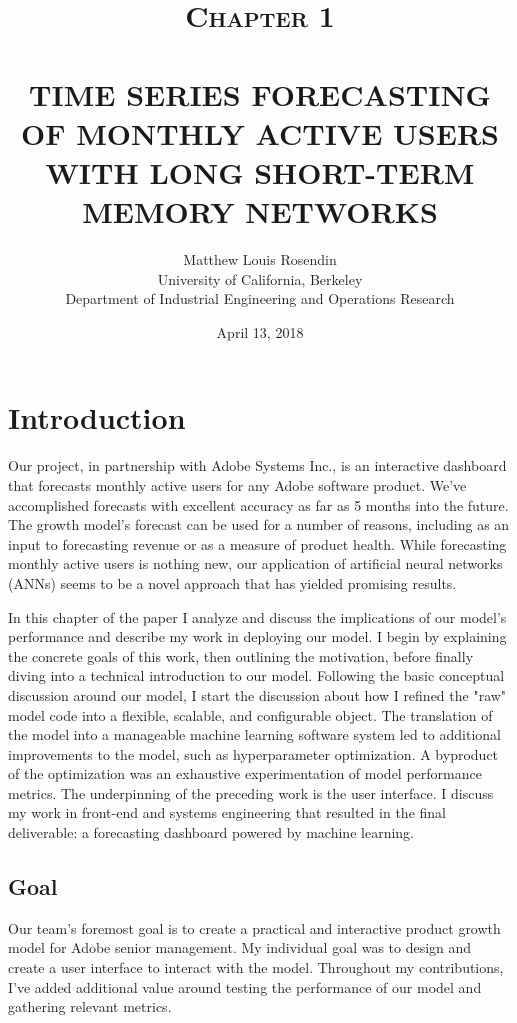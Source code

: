 \documentclass[11pt, oneside]{article}
\title{
  \normalsize \textsc{Chapter 1} \\ [2.0cm]
  \HRule{0.5pt} \\
  \LARGE \textbf{\uppercase{
  Time Series Forecasting of Monthly Active Users with Long Short-Term Memory
      Networks
  }}
  \HRule{2pt} \\ [0.5cm]
  \vspace*{5\baselineskip}
}
\author{
  Matthew Louis Rosendin \\
  University of California, Berkeley \\
  Department of Industrial Engineering and Operations Research
}
\date{April 13, 2018}
\begin{document}
\maketitle
\newpage

\tableofcontents
\newpage

\listoffigures
\newpage

\section{Introduction}
Our project, in partnership with Adobe Systems Inc., is an interactive dashboard that forecasts monthly active users for any Adobe software product. We've accomplished forecasts with excellent accuracy as far as 5 months into the future. The growth model's forecast can be used for a number of reasons, including as an input to forecasting revenue or as a measure of product health. While forecasting monthly active users is nothing new, our application of artificial neural networks (ANNs) seems to be a novel approach that has yielded promising results.

In this chapter of the paper I analyze and discuss the implications of our model's performance and describe my work in deploying our model. I begin by explaining the concrete goals of this work, then outlining the motivation, before finally diving into a technical introduction to our model. Following the basic conceptual discussion around our model, I start the discussion about how I refined the "raw" model code into a flexible, scalable, and configurable object. The translation of the model into a manageable machine learning software system led to additional improvements to the model, such as hyperparameter optimization. A byproduct of the optimization was an exhaustive experimentation of model performance metrics. The underpinning of the preceding work is the user interface. I discuss my work in front-end and systems engineering that resulted in the final deliverable: a forecasting dashboard powered by machine learning.

\subsection{Goal}
Our team's foremost goal is to create a practical and interactive product growth model for Adobe senior management. My individual goal was to design and create a user interface to interact with the model. Throughout my contributions, I've added additional value around testing the performance of our model and gathering relevant metrics.
\end{document}
